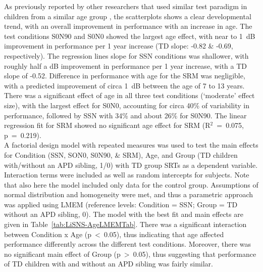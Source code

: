 \documentclass[a4paper, twoside]{templates/ociamthesis}
\begin{document}
As previously reported by other researchers that used similar test paradigm in children from a similar age group \autocites[e.g.,][]{Cameron2007,Murphy2019}, the scatterplots shows a clear developmental trend, with an overall improvement in performance with an increase in age. The test conditions S0N90 and S0N0 showed the largest age effect, with near to 1~dB improvement in performance per 1 year increase (TD slope: -0.82 \& -0.69, respectively). The regression lines slope for SSN conditions was shallower, with roughly half a dB improvement in performance per 1 year increase, with a TD slope of -0.52. Difference in performance with age for the SRM was negligible, with a predicted improvement of circa 1~dB between the age of 7 to 13 years. There was a significant effect of age in all three test conditions (`moderate' effect size), with the largest effect for S0N0, accounting for circa 40\% of variability in performance, followed by SSN with 34\% and about 26\% for S0N90. The linear regression fit for SRM showed no significant age effect for SRM (R\(^{2}\)~=~0.075, p~=~0.219).\\

A factorial design model with repeated measures was used to test the main effects for Condition (SSN, SON0, S0N90, \& SRM), Age, and Group (TD children with/without an APD sibling, 1/0) with TD group SRTs as a dependent variable. Interaction terms were included as well as random intercepts for subjects. Note that also here the model included only data for the control group. Assumptions of normal distribution and homogeneity were met, and thus a parametric approach was applied using LMEM (reference levels: Condition = SSN; Group = TD without an APD sibling, 0). The model with the best fit and main effects are given in Table~\ref{tab:LiSNS-AgeLMEMTab}. There was a significant interaction between Condition x Age (p~\textless~0.05), thus indicating that age affected performance differently across the different test conditions. Moreover, there was no significant main effect of Group (p~\textgreater~0.05), thus suggesting that performance of TD children with and without an APD sibling was fairly similar.
\end{document}
